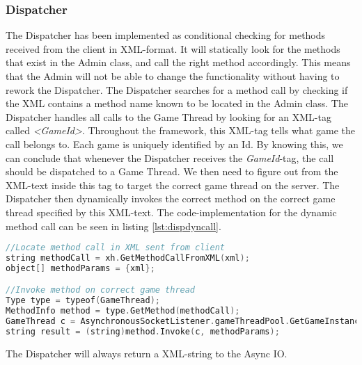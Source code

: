 \subsubsection{Dispatcher}
\label{sec:dispImplementation}
The Dispatcher has been implemented as conditional checking for methods received from the client in XML-format. It will statically look for the methods that exist in the Admin class, and call the right method accordingly. This means that the Admin will not be able to change the functionality without having to rework the Dispatcher. The Dispatcher searches for a method call by checking if the XML contains a method name known to be located in the Admin class. The Dispatcher handles all calls to the Game Thread by looking for an XML-tag called \textit{<GameId>}. Throughout the framework, this XML-tag tells what game the call belongs to. Each game is uniquely identified by an Id. By knowing this, we can conclude that whenever the Dispatcher receives the \textit{GameId}-tag, the call should be dispatched to a Game Thread. We then need to figure out from the XML-text inside this tag to target the correct game thread on the server. The Dispatcher then dynamically invokes the correct method on the correct game thread specified by this XML-text. The code-implementation for the dynamic method call can be seen in listing \ref{lst:dispdyncall}.

\begin{lstlisting}[caption={Dynamically invoking methods on game threads}, language=C, label={lst:dispdyncall}]
//Locate method call in XML sent from client
string methodCall = xh.GetMethodCallFromXML(xml);
object[] methodParams = {xml};

//Invoke method on correct game thread
Type type = typeof(GameThread);
MethodInfo method = type.GetMethod(methodCall);
GameThread c = AsynchronousSocketListener.gameThreadPool.GetGameInstance(xh.GetGameIdFromXML(xml));
string result = (string)method.Invoke(c, methodParams);
\end{lstlisting}

The Dispatcher will always return a XML-string to the Async IO.